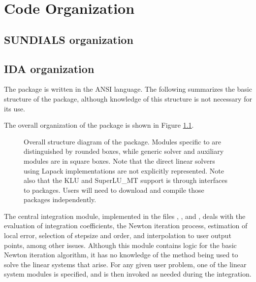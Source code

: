 \chapter{Code Organization}\label{s:organization}

\section{SUNDIALS organization}\label{ss:sun_org}


\section{IDA organization}\label{ss:ida_org}

The {\ida} package is written in the ANSI {\C} language. The following
summarizes the basic structure of the package, although knowledge
of this structure is not necessary for its use.

The overall organization of the {\ida} package is shown in Figure
\ref{f:idaorg}.
\begin{figure}
{\centerline{}}
\caption [Overall structure diagram of the {\ida} package]
{Overall structure diagram of the {\ida} package.
  Modules specific to {\ida} are distinguished by rounded boxes, while 
  generic solver and auxiliary modules are in square boxes.
  Note that the direct linear solvers using Lapack implementations are not 
  explicitly represented.
  Note also that the KLU and SuperLU\_MT support 
  is through interfaces
  to packages.  Users will need to download and compile those packages independently.}
\label{f:idaorg}
\end{figure}
The central integration module, implemented in the files ,
, and , deals with the evaluation of integration 
coefficients, the Newton iteration process, estimation of local error,
selection of stepsize and order, and interpolation to user output
points, among other issues.  Although this module contains logic for
the basic Newton iteration algorithm, it has no knowledge of the
method being used to solve the linear systems that arise.  For any
given user problem, one of the linear system modules is specified, and
is then invoked as needed during the integration. 

